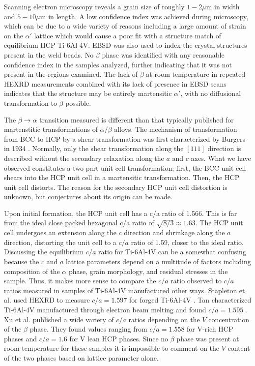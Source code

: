 Scanning electron microscopy reveals a grain size of roughly $1-2 \mu$m in width and $5-10 \mu$m in length. A low confidence index was achieved during microscopy, which can be due to a wide variety of reasons including a large amount of strain on the $\alpha'$ lattice which would cause a poor fit with a structure match of equilibrium HCP Ti-6Al-4V. EBSD was also used to index the crystal structures present in the weld beads. No $\beta$ phase was identified with any reasonable confidence index in the samples analyzed, further indicating that it was not present in the regions examined. The lack of $\beta$ at room temperature in repeated HEXRD measurements combined with its lack of presence in EBSD scans indicates that the structure may be entirely martensitic $\alpha'$, with no diffusional transformation to $\beta$ possible.

The $\beta \to \alpha$ transition measured is different than that typically published for martenstitic transformations of $\alpha/\beta$ alloys. The mechanism of transformation from BCC to HCP by a shear transformation was first characterized by Burgers in 1934 \cite{Burgers1934}. Normally, only the shear transformation along the $\left[111\right]$ direction is described without the secondary relaxation along the $a$ and $c$ axes. What we have observed constitutes a two part unit cell transformation; first, the BCC unit cell shears into the HCP unit cell in a martensitic transformation. Then, the HCP unit cell distorts. The reason for the secondary HCP unit cell distortion is unknown, but conjectures about its origin can be made.

Upon initial formation, the HCP unit cell has a c/a ratio of 1.566. This is far from the ideal close packed hexagonal c/a ratio of $\sqrt{8/3} \approx 1.63$. The HCP unit cell undergoes an extension along the $c$ direction and shrinkage along the $a$ direction, distorting the unit cell to a $c/a$ ratio of 1.59, closer to the ideal ratio. Discussing the equilibrium $c/a$ ratio for Ti-6Al-4V can be a somewhat confusing because the $c$ and $a$ lattice parameters depend on a multitude of factors including composition of the $\alpha$ phase, grain morphology, and residual stresses in the sample. Thus, it makes more sense to compare the $c/a$ ratio observed to $c/a$ ratios measured in samples of Ti-6Al-4V manufactured other ways. Stapleton et al. used HEXRD to measure $c/a = 1.597$ for forged Ti-6Al-4V \cite{Stapleton2008}. Tan characterized Ti-6Al-4V manufactured through electron beam melting and found $c/a = 1.595$ \cite{Tan2015}. Xu et al. published a wide variety of $c/a$ ratios depending on the $V$ concentration of the $\beta$ phase. They found values ranging from $c/a = 1.558$ for V-rich HCP phases and $c/a=1.6$ for V lean HCP phases. Since no $\beta$ phase was present at room temperature for these samples it is impossible to comment on the $V$ content of the two phases based on lattice parameter alone. 

